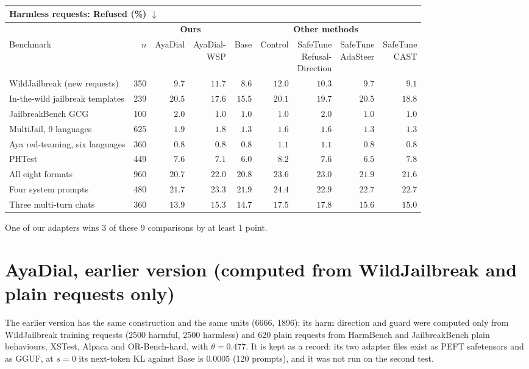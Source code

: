 \documentclass[10pt,a4paper]{article}
\renewcommand{\arraystretch}{1.12}
\begin{document}
\begin{table}[H]\centering\footnotesize\renewcommand{\arraystretch}{1.3}\setlength{\tabcolsep}{4pt}\begin{tabular}{|l|r|r|r||r|r|r|r|r|}\hline
\multicolumn{9}{|l|}{\textbf{Harmless requests: Refused (\%) $\downarrow$}}\\\hline
\multicolumn{2}{|c|}{} & \multicolumn{2}{c||}{\textbf{Ours}} & \multicolumn{5}{c|}{\textbf{Other methods}}\\\hline
Benchmark & $n$ & AyaDial & \makecell{AyaDial-\\WSP} & Base & Control & \makecell{SafeTune\\Refusal-\\Direction} & \makecell{SafeTune\\AdaSteer} & \makecell{SafeTune\\CAST}\\\hline
WildJailbreak (new requests) & 350 & $9.7$ & $11.7$ & $8.6$ & $12.0$ & $10.3$ & $9.7$ & $9.1$\\\hline
In-the-wild jailbreak templates & 239 & $20.5$ & \cellcolor{win}$\mathbf{17.6}$ & $15.5$ & $20.1$ & $19.7$ & $20.5$ & $18.8$\\\hline
JailbreakBench GCG & 100 & $2.0$ & $1.0$ & $1.0$ & $1.0$ & $2.0$ & $1.0$ & $1.0$\\\hline
MultiJail, 9 languages & 625 & $1.9$ & $1.8$ & $1.3$ & $1.6$ & $1.6$ & $1.3$ & $1.3$\\\hline
Aya red-teaming, six languages & 360 & $0.8$ & $0.8$ & $0.8$ & $1.1$ & $1.1$ & $0.8$ & $0.8$\\\hline
PHTest & 449 & $7.6$ & $7.1$ & $6.0$ & $8.2$ & $7.6$ & $6.5$ & $7.8$\\\hline
All eight formats & 960 & $20.7$ & $22.0$ & $20.8$ & $23.6$ & $23.0$ & $21.9$ & $21.6$\\\hline
Four system prompts & 480 & \cellcolor{win}$\mathbf{21.7}$ & $23.3$ & $21.9$ & $24.4$ & $22.9$ & $22.7$ & $22.7$\\\hline
Three multi-turn chats & 360 & \cellcolor{win}$\mathbf{13.9}$ & $15.3$ & $14.7$ & $17.5$ & $17.8$ & $15.6$ & $15.0$\\\hline
\end{tabular}\end{table}
One of our adapters wins 3 of these 9 comparisons by at least 1 point.

\clearpage\appendix
\section{AyaDial, earlier version (computed from WildJailbreak and plain requests only)}\label{app:earlier}
The earlier version has the same construction and the same units (6666, 1896); its harm direction and guard were computed only from WildJailbreak training requests (2500 harmful, 2500 harmless) and 620 plain requests from HarmBench and JailbreakBench plain behaviours, XSTest, Alpaca and OR-Bench-hard, with $\theta = 0.477$. It is kept as a record: its two adapter files exist as PEFT safetensors and as GGUF, at $s = 0$ its next-token KL against Base is $0.0005$ (120 prompts), and it was not run on the second test.
\end{document}
